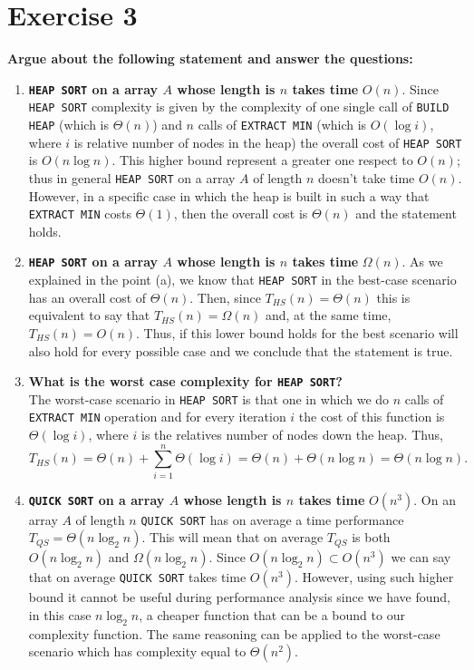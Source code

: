 \documentclass{article}
\begin{document}
	\section*{Exercise 3}
	\textbf{Argue about the following statement and answer the questions:}
	\begin{enumerate}[label=(\alph*)]
		\item \textbf{\texttt{HEAP SORT} on a array $A$ whose length is $n$ takes time} $O(n)$. 
		Since \texttt{HEAP SORT} complexity is given by the complexity of one single call of \texttt{BUILD HEAP} (which is $\Theta(n)$) and $n$ calls of \texttt{EXTRACT MIN} (which is $O(\log i)$, where $i$ is relative number of nodes in the heap) the overall cost of \texttt{HEAP SORT} is $O(n\log n)$. This higher bound represent a greater one respect to $O(n)$; thus in general \texttt{HEAP SORT} on a array $A$ of length $n$ doesn't take time $O(n)$. \\
		However, in a specific case in which the heap is built in such a way that \texttt{EXTRACT MIN} costs $\Theta(1)$, then the overall cost is $\Theta(n)$ and the statement holds.
		
		 
		\item \textbf{\texttt{HEAP SORT} on a array $A$ whose length is $n$ takes time} $\Omega(n)$. 
		As we explained in the point (a), we know that \texttt{HEAP SORT} in the best-case scenario has an overall cost of $\Theta(n)$. Then, since $T_{HS} (n) = \Theta(n)$ this is equivalent to say that  $T_{HS} (n) = \Omega(n)$ and, at the same time, $T_{HS} (n) = O(n)$. Thus, if this lower bound holds for the best scenario will also hold for every possible case and we conclude that the statement is true. 
		
		\item \textbf{What is the worst case complexity for \texttt{HEAP SORT}?}\\
		The worst-case scenario in \texttt{HEAP SORT} is that one in which we do $n$ calls of \texttt{EXTRACT MIN} operation and for every iteration $i$ the cost of this function is $\Theta(\log i)$, where $i$ is the relatives number of nodes down the heap. Thus,
		\begin{equation*}
		T_{HS} (n) = \Theta(n) + \sum_{i=1}^{n} \Theta(\log i) = \Theta(n) + \Theta(n\log n) = \Theta(n\log n).  
		\end{equation*}
		
		\item \textbf{\texttt{QUICK SORT} on a array $A$ whose length is $n$ takes time} $O(n^3)$. 
		On an array $A$ of length $n$ \texttt{QUICK SORT} has on average a time performance $T_{QS} = \Theta(n \log_2 n) $.  This will mean that on average $T_{QS}$ is both $O(n\log_2 n)$ and $\Omega(n\log_2 n)$. Since $O(n\log_2 n) \subset O(n^3)$ we can say that on  average \texttt{QUICK SORT} takes time $O(n^3)$. However, using such higher bound it cannot be useful during performance analysis since we have found, in this case $n\log_2 n$, a cheaper function that can be a bound to our complexity function. 
		The same reasoning can be applied to the worst-case scenario which has complexity equal to $\Theta(n^2) $.
		

\end{enumerate}
\end{document}
